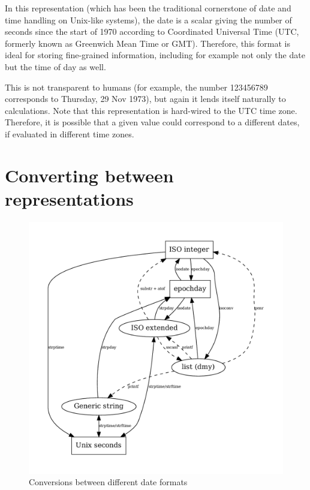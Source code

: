 In this representation (which has been the traditional cornerstone of
date and time handling on Unix-like systems), the date is a scalar
giving the number of seconds since the start of 1970 according to
Coordinated Universal Time (UTC, formerly known as Greenwich Mean
Time or GMT). Therefore, this format is ideal for storing fine-grained
information, including for example not only the date but the time of
day as well.

This is not transparent to humans (for example, the number 123456789
corresponds to Thursday, 29 Nov 1973), but again it lends itself
naturally to calculations. Note that this representation is hard-wired
to the UTC time zone. Therefore, it is possible that a given value
could correspond to a different dates, if evaluated in different time
zones.

\section{Converting between representations}
\label{sec:cal-conversions}

\begin{figure}[htbp]
  \centering
  \includegraphics[scale=0.667]{figures/date-conversion}
  \caption{Conversions between different date formats}
  \label{fig:cal-conversions}
\end{figure}


